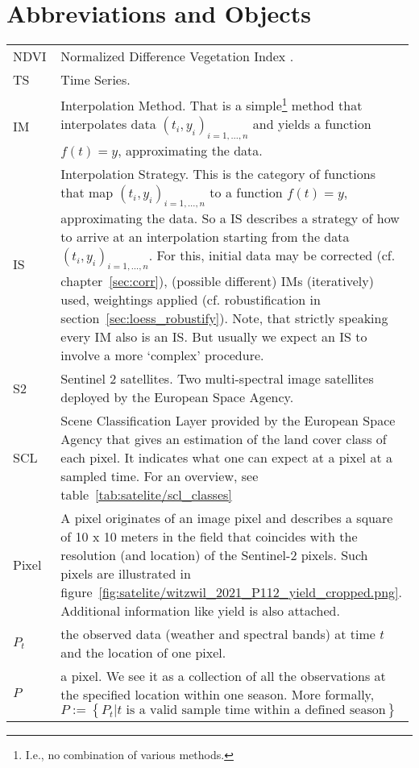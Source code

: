 \section*{Abbreviations and Objects}\vspace{-0.2cm}
\begin{longtable}{p{0.12\linewidth} p{0.87\linewidth}}
NDVI	
		& Normalized Difference Vegetation Index \citep{rouseMonitoringVernalAdvancement1974}.\\

TS	
		& Time Series. \\
IM	
		& Interpolation Method. That is a simple\footnote{I.e., no combination of various methods.} method that interpolates data $(t_i,y_i)_{i = 1,\dots ,n}$ and yields a function $f(t)=y$, approximating the data. \\
IS	
		& Interpolation Strategy. This is the category of functions that map $(t_i,y_i)_{i=1,\dots,n}$ to a function $f(t)=y$, approximating the data. So a IS describes a strategy of how to arrive at an interpolation starting from the data $(t_i,y_i)_{i=1,\dots,n}$. For this, initial data may be corrected (cf. chapter~\ref{sec:corr}), (possible different) IMs (iteratively) used, weightings applied (cf. robustification in section~\ref{sec:loess_robustify}). Note, that strictly speaking every IM also is an IS. But usually we expect an IS to involve a more `complex' procedure. \\
S2	
		& Sentinel 2 satellites. Two multi-spectral image satellites deployed by the European Space Agency. \\
SCL	
		& Scene Classification Layer provided by the European Space Agency that gives an estimation of the land cover class of each pixel. It indicates what one can expect at a pixel at a sampled time. For an overview, see table~\ref{tab:satelite/scl_classes}\\
Pixel	
		& A pixel originates of an image pixel and describes a square of 10 x 10 meters in the field that coincides with the resolution (and location) of the Sentinel-2 pixels. Such pixels are illustrated in figure~\ref{fig:satelite/witzwil_2021_P112_yield_cropped.png}. Additional information like yield is also attached.\\

$P_t$	
		& the observed data (weather and spectral bands) at time $t$ and the location of one pixel. \\

$P$	
		& a pixel. We see it as a collection of all the observations at the specified location within one season. More formally, $P := \left\{P_t | t\text{ is a valid sample time within a defined season}\right\}$\\



\end{longtable}

